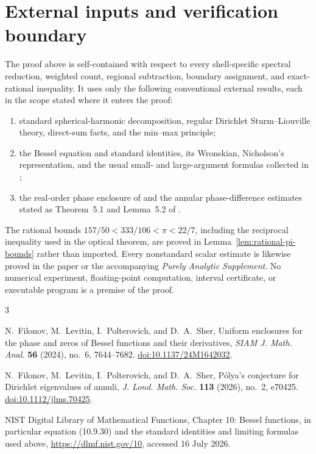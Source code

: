 \documentclass[11pt]{article}
\numberwithin{equation}{section}
\theoremstyle{definition}
\theoremstyle{remark}
\begin{document}
\section{External inputs and verification boundary}
\label{app:external-boundary}

The proof above is self-contained with respect to every shell-specific
spectral reduction, weighted count, regional subtraction, boundary assignment,
and exact-rational inequality.  It uses only the following conventional
external results, each in the scope stated where it enters the proof:
\begin{enumerate}
  \item standard spherical-harmonic decomposition, regular
        Dirichlet Sturm--Liouville theory, direct-sum facts, and the min--max
        principle;
  \item the Bessel equation and standard identities, its Wronskian,
        Nicholson's representation, and the usual small- and large-argument
        formulas collected in \cite{DLMF};
  \item the real-order phase enclosure of \cite{FLPSphase} and the annular
        phase-difference estimates stated as Theorem~5.1 and Lemma~5.2 of
        \cite{FLPSannuli}.
\end{enumerate}

The rational bounds
\(157/50<333/106<\pi<22/7\), including the reciprocal inequality used in
the optical theorem, are proved in Lemma~\ref{lem:rational-pi-bounds} rather
than imported.  Every nonstandard scalar estimate is likewise proved in the
paper or the accompanying \emph{Purely Analytic Supplement}.  No numerical
experiment, floating-point computation, interval certificate, or executable
program is a premise of the proof.

\begin{thebibliography}{3}

N.~Filonov, M.~Levitin, I.~Polterovich, and D.~A.~Sher,
\newblock Uniform enclosures for the phase and zeros of Bessel functions and
their derivatives,
\newblock \emph{SIAM J. Math. Anal.} \textbf{56} (2024), no.~6, 7644--7682.
\newblock \href{https://doi.org/10.1137/24M1642032}{doi:10.1137/24M1642032}.

N.~Filonov, M.~Levitin, I.~Polterovich, and D.~A.~Sher,
\newblock P\'olya's conjecture for Dirichlet eigenvalues of annuli,
\newblock \emph{J. Lond. Math. Soc.} \textbf{113} (2026), no.~2, e70425.
\newblock \href{https://doi.org/10.1112/jlms.70425}{doi:10.1112/jlms.70425}.

NIST Digital Library of Mathematical Functions,
\newblock Chapter 10: Bessel functions, in particular equation (10.9.30)
and the standard identities and limiting formulas used above,
\newblock \url{https://dlmf.nist.gov/10}, accessed 16 July 2026.

\end{thebibliography}
\end{document}
